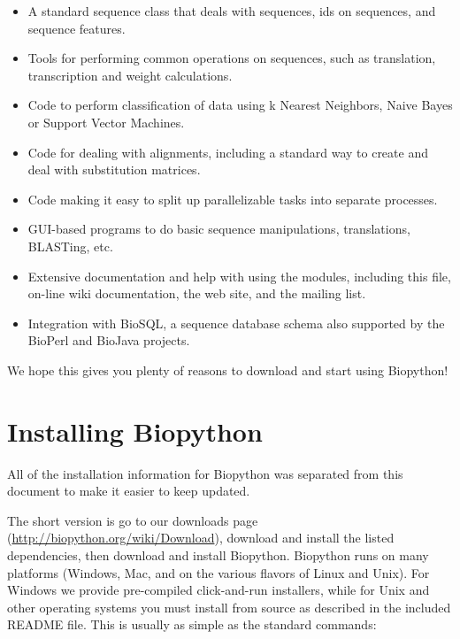 \documentclass{report}
\begin{document}
\begin{itemize}
  \item A standard sequence class that deals with sequences, ids on sequences, and sequence features.

  \item Tools for performing common operations on sequences, such as translation, transcription and weight calculations.

  \item Code to perform classification of data using k Nearest Neighbors, Naive Bayes or Support Vector Machines.

  \item Code for dealing with alignments, including a standard way to create and deal with substitution matrices.

  \item Code making it easy to split up parallelizable tasks into separate processes.

  \item GUI-based programs to do basic sequence manipulations, translations, BLASTing, etc.

  \item Extensive documentation and help with using the modules, including this file, on-line wiki documentation, the web site, and the mailing list.

  \item Integration with BioSQL, a sequence database schema also supported by the BioPerl and BioJava projects.

\end{itemize}

We hope this gives you plenty of reasons to download and start using Biopython!

\section{Installing Biopython}

All of the installation information for Biopython was separated from
this document to make it easier to keep updated.

The short version is go to our downloads page (\url{http://biopython.org/wiki/Download}),
download and install the listed dependencies, then download and install Biopython.
Biopython runs on many platforms (Windows, Mac, and on the various flavors of Linux and Unix).
For Windows we provide pre-compiled click-and-run installers, while for Unix and other
operating systems you must install from source as described in the included README file.
This is usually as simple as the standard commands:
\end{document}
